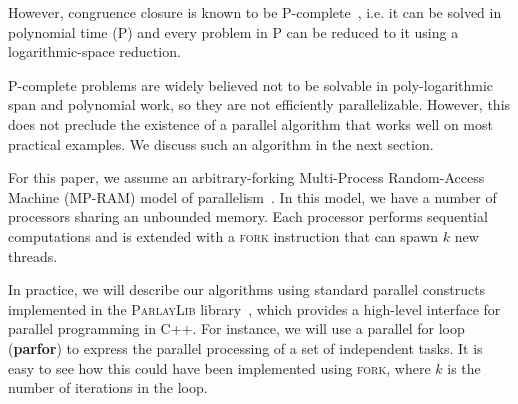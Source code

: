 However, congruence closure is known to be
\textsc{P}-complete~\cite{unification}, i.e. it can be solved in polynomial time (\textsc{P})
and every problem in \textsc{P} can be reduced to it using a logarithmic-space reduction.

    


\textsc{P}-complete problems are widely believed not to be solvable in
poly-logarithmic span and polynomial work, so they are not efficiently
parallelizable. However, this does not preclude the existence of a parallel
algorithm that works well on most practical examples. We discuss such an
algorithm in the next section.


For this paper, we assume an arbitrary-forking Multi-Process Random-Access
Machine (MP-RAM) model of parallelism~\cite{parallel-algos}. In this model, we have a
number of processors sharing an unbounded memory. Each processor performs
sequential computations and is extended with a \textsc{fork} instruction
that can spawn $k$ new threads.

In practice, we will describe our algorithms using standard parallel constructs
implemented in the \textsc{ParlayLib} library~\cite{parlaylib}, which provides a
high-level interface for parallel programming in C++. For instance, we will use 
a parallel for loop (\textbf{parfor}) to express the parallel processing of a set of
independent tasks. It is easy to see how this could have been implemented using 
\textsc{fork}, where $k$ is the number of iterations in the loop.

